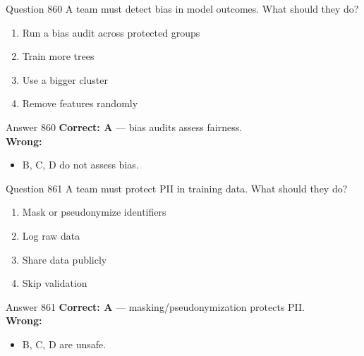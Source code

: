 \documentclass[aspectratio=169,11pt]{beamer}
\begin{document}
	\begin{frame}{Question 860}
		A team must detect bias in model outcomes. What should they do?
		\begin{enumerate}[label=\Alph*.]
			\item Run a bias audit across protected groups
			\item Train more trees
			\item Use a bigger cluster
			\item Remove features randomly
		\end{enumerate}
	\end{frame}
	\begin{frame}{Answer 860}
		\textbf{Correct: A} --- bias audits assess fairness.\\
		\vspace{0.5em}
		\textbf{Wrong:}
		\begin{itemize}
			\item B, C, D do not assess bias.
		\end{itemize}
	\end{frame}
	
	\begin{frame}{Question 861}
		A team must protect PII in training data. What should they do?
		\begin{enumerate}[label=\Alph*.]
			\item Mask or pseudonymize identifiers
			\item Log raw data
			\item Share data publicly
			\item Skip validation
		\end{enumerate}
	\end{frame}
	\begin{frame}{Answer 861}
		\textbf{Correct: A} --- masking/pseudonymization protects PII.\\
		\vspace{0.5em}
		\textbf{Wrong:}
		\begin{itemize}
			\item B, C, D are unsafe.
		\end{itemize}
	\end{frame}
	
\end{document}
